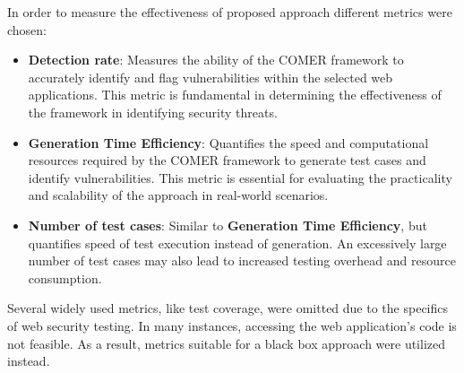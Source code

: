 In order to measure the effectiveness of proposed approach different metrics were chosen:

\begin{itemize}
	\item \textbf{Detection rate}: Measures the ability of the COMER framework to accurately identify and flag vulnerabilities within the selected web applications. This metric is fundamental in determining the effectiveness of the framework in identifying security threats.
	\item \textbf{Generation Time Efficiency}: Quantifies the speed and computational resources required by the COMER framework to generate test cases and identify vulnerabilities. This metric is essential for evaluating the practicality and scalability of the approach in real-world scenarios.
	\item \textbf{Number of test cases}: Similar to \textbf{Generation Time Efficiency}, but quantifies speed of test execution instead of generation. An excessively large number of test cases may also lead to increased testing overhead and resource consumption. 
\end{itemize}

Several widely used metrics, like test coverage, were omitted due to the specifics of web security testing. In many instances, accessing the web application's code is not feasible. As a result, metrics suitable for a black box approach were utilized instead.